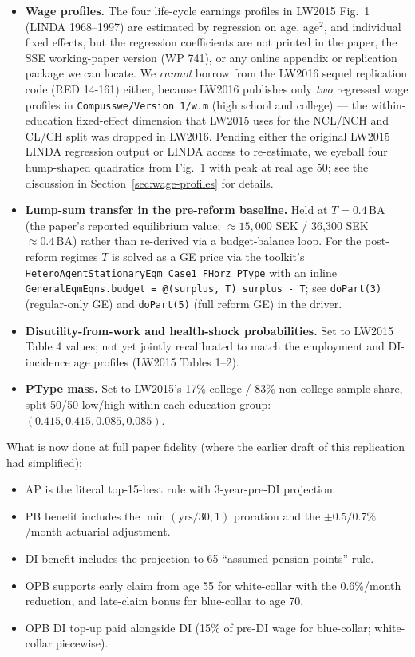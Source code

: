\begin{itemize}
\item \textbf{Wage profiles.} The four life-cycle earnings profiles in LW2015 Fig.~1 (LINDA 1968--1997) are estimated by regression on age, age$^2$, and individual fixed effects, but the regression coefficients are not printed in the paper, the SSE working-paper version (WP 741), or any online appendix or replication package we can locate. We \emph{cannot} borrow from the LW2016 sequel replication code (RED 14-161) either, because LW2016 publishes only \emph{two} regressed wage profiles in \verb|Compusswe/Version 1/w.m| (high school and college) --- the within-education fixed-effect dimension that LW2015 uses for the NCL/NCH and CL/CH split was dropped in LW2016. Pending either the original LW2015 LINDA regression output or LINDA access to re-estimate, we eyeball four hump-shaped quadratics from Fig.~1 with peak at real age 50; see the discussion in Section~\ref{sec:wage-profiles} for details.
\item \textbf{Lump-sum transfer in the pre-reform baseline.} Held at $T = 0.4\,\text{BA}$ (the paper's reported equilibrium value; $\approx 15{,}000$ SEK / 36{,}300 SEK $\approx 0.4\,\text{BA}$) rather than re-derived via a budget-balance loop. For the post-reform regimes $T$ is solved as a GE price via the toolkit's \texttt{HeteroAgentStationaryEqm\_Case1\_FHorz\_PType} with an inline \texttt{GeneralEqmEqns.budget = @(surplus, T) surplus - T}; see \texttt{doPart(3)} (regular-only GE) and \texttt{doPart(5)} (full reform GE) in the driver.
\item \textbf{Disutility-from-work and health-shock probabilities.} Set to LW2015 Table 4 values; not yet jointly recalibrated to match the employment and DI-incidence age profiles (LW2015 Tables 1--2).
\item \textbf{PType mass.} Set to LW2015's 17\% college / 83\% non-college sample share, split 50/50 low/high within each education group: $(0.415, 0.415, 0.085, 0.085)$.
\end{itemize}

What is now done at full paper fidelity (where the earlier draft of this replication had simplified):
\begin{itemize}
\item AP is the literal top-15-best rule with 3-year-pre-DI projection.
\item PB benefit includes the $\min(\text{yrs}/30,1)$ proration and the $\pm 0.5/0.7\%$/month actuarial adjustment.
\item DI benefit includes the projection-to-65 ``assumed pension points'' rule.
\item OPB supports early claim from age 55 for white-collar with the 0.6\%/month reduction, and late-claim bonus for blue-collar to age 70.
\item OPB DI top-up paid alongside DI (15\% of pre-DI wage for blue-collar; white-collar piecewise).
\end{itemize}

